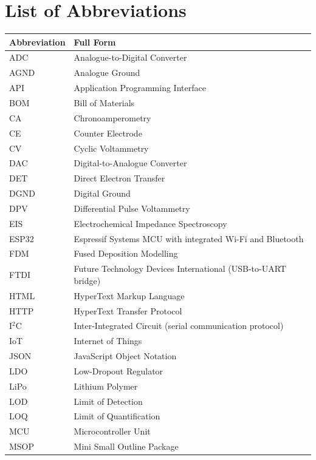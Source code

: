 \chapter*{List of Abbreviations}
\thispagestyle{plain}

\begin{longtable}{@{}p{3.5cm}p{10cm}@{}}
\toprule
\textbf{Abbreviation} & \textbf{Full Form} \\
\midrule
\endhead
\bottomrule
\endfoot

ADC    & Analogue-to-Digital Converter \\
AGND   & Analogue Ground \\
API    & Application Programming Interface \\
BOM    & Bill of Materials \\
CA     & Chronoamperometry \\
CE     & Counter Electrode \\
CV     & Cyclic Voltammetry \\
DAC    & Digital-to-Analogue Converter \\
DET    & Direct Electron Transfer \\
DGND   & Digital Ground \\
DPV    & Differential Pulse Voltammetry \\
EIS    & Electrochemical Impedance Spectroscopy \\
ESP32  & Espressif Systems MCU with integrated Wi-Fi and Bluetooth \\
FDM    & Fused Deposition Modelling \\
FTDI   & Future Technology Devices International (USB-to-UART bridge) \\
HTML   & HyperText Markup Language \\
HTTP   & HyperText Transfer Protocol \\
I$^2$C & Inter-Integrated Circuit (serial communication protocol) \\
IoT    & Internet of Things \\
JSON   & JavaScript Object Notation \\
LDO    & Low-Dropout Regulator \\
LiPo   & Lithium Polymer \\
LOD    & Limit of Detection \\
LOQ    & Limit of Quantification \\
MCU    & Microcontroller Unit \\
MSOP   & Mini Small Outline Package \\

\end{longtable}
